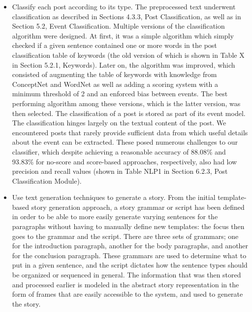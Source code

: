 \begin{itemize}
	\item Classify each post according to its type. \newline\newline
	The preprocessed text underwent classification as described in Sections 4.3.3, Post Classification, as well as in Section 5.2, Event Classification. Multiple versions of the classification algorithm were designed. At first, it was a simple algorithm which simply checked if a given sentence contained one or more words in the post classification table of keywords (the old version of which is shown in Table X in Section 5.2.1, Keywords). \newline\newline
	Later on, the algorithm was improved, which consisted of augmenting the table of keywords with knowledge from ConceptNet and WordNet as well as adding a scoring system with a minimum threshold of 2 and an enforced bias between events. The best performing algorithm among these versions, which is the latter version, was then selected. The classification of a post is stored as part of its event model. 
	\newline\newline
	The classification hinges largely on the textual content of the post. We encountered posts that rarely provide sufficient data from which useful details about the event can be extracted. These posed numerous challenges to our classifier, which despite achieving a reasonable accuracy of 88.08\% and 93.83\% for no-score and score-based approaches, respectively, also had low precision and recall values (shown in Table NLP1 in Section 6.2.3, Post Classification Module). \newline\newline
	
	\item Use text generation techniques to generate a story. \newline\newline
	From the initial template-based story generation approach, a story grammar or script has been defined in order to be able to more easily generate varying sentences for the paragraphs without having to manually define new templates: the focus then goes to the grammar and the script. There are three sets of grammars; one for the introduction paragraph, another for the body paragraphs, and another for the conclusion paragraph. These grammars are used to determine what to put in a given sentence, and the script dictates how the sentence types should be organized or sequenced in general. The information that was then stored and processed earlier is modeled in the abstract story representation in the form of frames that are easily accessible to the system, and used to generate the story. \newline\newline
	

\end{itemize}
